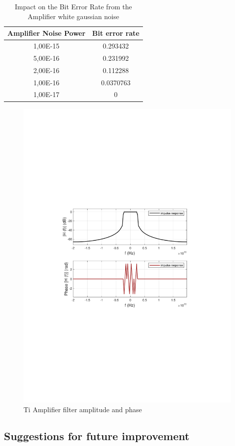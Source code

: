 \begin{table}[h]
\begin{center}
	\begin{tabular}{| c | c | }
		\hline
		\textbf{Amplifier Noise Power} & \textbf{Bit error rate} \\ \hline
        1,00E-15 & 0.293432 \\ \hline
        5,00E-16 & 0.231992 \\ \hline
        2,00E-16 & 0.112288 \\ \hline
        1,00E-16 & 0.0370763 \\ \hline
        1,00E-17 & 0 \\ \hline
	\end{tabular}
	\caption{Impact on the Bit Error Rate from the Amplifier white gaussian noise} \label{BER_TABLE2}
\end{center}
\end{table}

\begin{figure}[h]
	\centering
    \includegraphics[clip, trim=0.5cm 9cm 0.5cm 9cm, width=\textwidth]{./lib/m_qam_receiver/figures/Filter.pdf}
    \caption{Ti Amplifier filter amplitude and phase}\label{ReceiverAmplifierFilter}
\end{figure}

\subsection*{Suggestions for future improvement}
